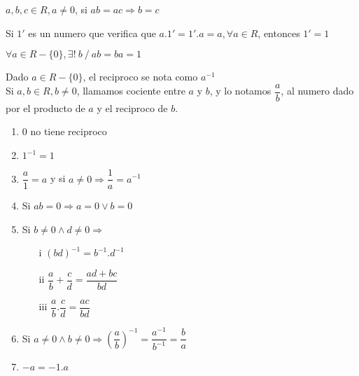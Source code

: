 \documentclass[10pt]{article}
\begin{document}
\begin{theo}{}
$a,b,c \in R, a \not = 0$, si $ab=ac \Rightarrow b=c$
\end{theo}

\begin{theo}{}
Si $1'$ es un numero que verifica que $a.1' = 1'.a = a, \forall a \in R$, entonces $1'=1$
\end{theo}

\begin{cor}{}
$\forall a \in R-\{0\}, \exists!\ b\ /\ ab = ba = 1$
\end{cor}

\begin{data}
Dado $a \in R-\{0\}$, el reciproco se nota como $a^{-1}$\\

Si $a,b \in R, b \not = 0$, llamamos cociente entre $a$ y $b$, y lo notamos $\dfrac{a}{b}$, al numero dado por el producto de $a$ y el reciproco de $b$. 
\end{data}

\newpage

\begin{theo}[]{}
\begin{multicols}{2}
\begin{enumerate}
\item $0$ no tiene reciproco
\item $1^{-1} = 1$
\item $\dfrac{a}{1}=a$ y si $a \not = 0 \Rightarrow \dfrac{1}{a}=a^{-1}$
\item Si $ab=0 \Rightarrow a=0 \lor b=0$
\item Si $b \not = 0 \land d \not = 0 \Rightarrow$
\begin{enumerate}
\item [i] $(bd)^{-1} = b^{-1}.d^{-1}$
\item [ii] $\dfrac{a}{b} + \dfrac{c}{d} = \dfrac{ad+bc}{bd}$
\item [iii] $\dfrac{a}{b} . \dfrac{c}{d} = \dfrac{ac}{bd}$
\end{enumerate}
\item Si $a \not = 0 \land b \not = 0 \Rightarrow \left(\dfrac{a}{b}\right)^{-1} = \dfrac{a^{-1}}{b^{-1}} = \dfrac{b}{a}$
\item $-a = -1. a$
\end{enumerate}
\end{multicols}
\end{theo}
\end{document}
